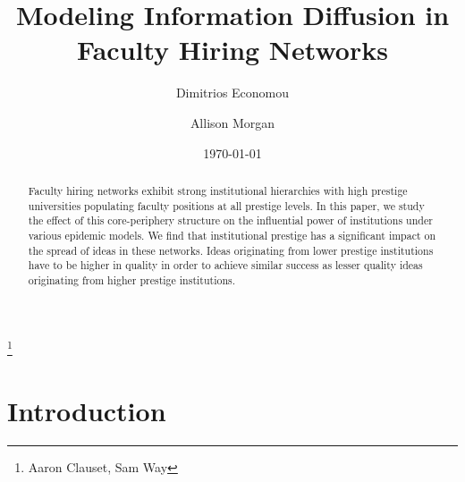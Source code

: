 \documentclass[%
 reprint,
 amsmath,amssymb,
 aps,
]{revtex4-1}
\begin{document}

\title{Modeling Information Diffusion in Faculty Hiring Networks}%
\thanks{Aaron Clauset, Sam Way}%

\author{Dimitrios Economou}%
\author{Allison Morgan}%
%


\date{\today}

\begin{abstract}
Faculty hiring networks exhibit strong institutional hierarchies with high prestige universities populating faculty positions at all prestige levels. In this paper, we study the effect of this core-periphery structure on the influential power of institutions under various epidemic models. We find that institutional prestige has a significant impact on the spread of ideas in these networks. Ideas originating from lower prestige institutions have to be higher in quality in order to achieve similar success as lesser quality ideas originating from higher prestige institutions.
\end{abstract}

\maketitle

\section{\label{sec:level1}Introduction}
\end{document}
